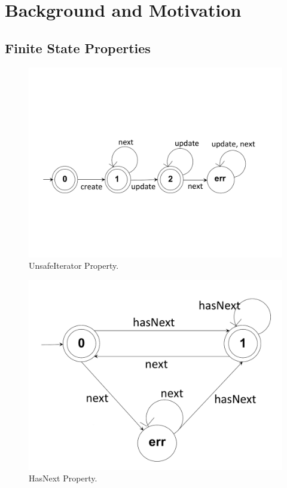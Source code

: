 \section{Background and Motivation}
\label{sec:motivation}


\subsection{Finite State Properties}
\label{sec:motivation:fsp}

\begin{figure}[t]
\centering
  \includegraphics[scale=0.3, trim=0 5cm 0 6cm]{./images/unsafeiterator.pdf}
  \caption[UnsafeIterator Property FSA]{UnsafeIterator Property.}
  \label{fig:unsafeiteratorfsa}
\end{figure}

\begin{figure}[t]
\centering
  \includegraphics[trim=20cm 0cm 15cm 1cm, scale=0.2]{./images/HasNext.pdf}
  \caption[HasNext Property FSA]{HasNext Property.}
  \label{fig:hasnextfsa}
\end{figure}

